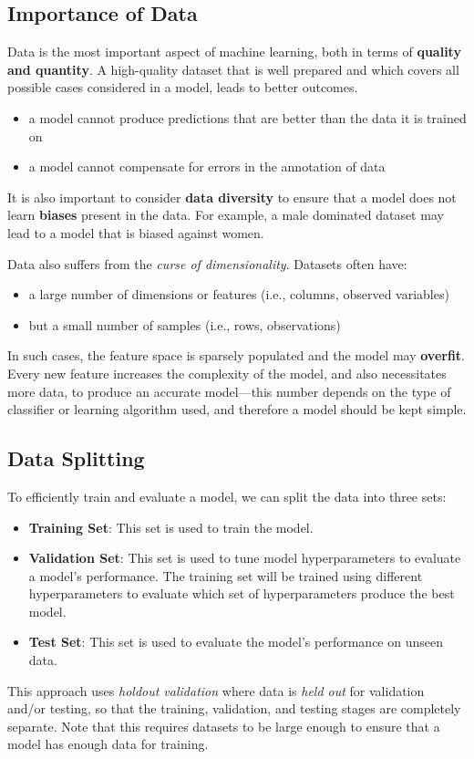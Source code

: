 \documentclass{article}
\begin{document}
\subsection{Importance of Data}
Data is the most important aspect of machine learning, both in terms of
\textbf{quality and quantity}. A high-quality dataset that is well
prepared and which covers all possible cases considered in a model,
leads to better outcomes.
\begin{itemize}
    \item a model cannot produce predictions that are better than the
          data it is trained on
    \item a model cannot compensate for errors in the annotation of
          data
\end{itemize}
It is also important to consider \textbf{data diversity} to ensure that
a model does not learn \textbf{biases} present in the data. For example,
a male dominated dataset may lead to a model that is biased against
women.

Data also suffers from the \textit{curse of dimensionality}. Datasets
often have:
\begin{itemize}
    \item a large number of dimensions or features (i.e., columns,
          observed variables)
    \item but a small number of samples (i.e., rows, observations)
\end{itemize}
In such cases, the feature space is sparsely populated and the model
may \textbf{overfit}. Every new feature increases the complexity
of the model, and also necessitates more data, to produce an accurate
model---this number depends on the type of classifier or learning
algorithm used, and therefore a model should be kept simple.
\subsection{Data Splitting}
To efficiently train and evaluate a model, we can split the data into
three sets:
\begin{itemize}
    \item \textbf{Training Set}: This set is used to train the model.
    \item \textbf{Validation Set}: This set is used to tune model
          hyperparameters to evaluate a model's performance. The training
          set will be trained using different hyperparameters to evaluate
          which set of hyperparameters produce the best model.
    \item \textbf{Test Set}: This set is used to evaluate the model's
          performance on unseen data.
\end{itemize}
This approach uses \textit{holdout validation} where data is
\textit{held out} for validation and/or testing, so that the training,
validation, and testing stages are completely separate. Note that this
requires datasets to be large enough to ensure that a model has enough
data for training.
\end{document}
